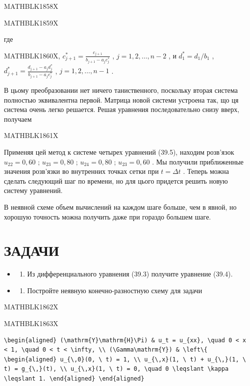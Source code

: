 \documentclass[
  ukrainian,
]{article}
\providecommand{\tightlist}{%
  \setlength{\itemsep}{0pt}\setlength{\parskip}{0pt}}
\begin{document}
MATHBLK1858X

MATHBLK1859X

где

MATHBLK1860X, \(c_{j+1}^* = \frac{c_{j+1}}{b_{j+1} - a_j c_j^*}\) ,
\(j = 1, 2, \ldots, n-2\) , и \(d_1^* = d_1/b_1\) ,
\(d_{j+1}^* = \frac{d_{j+1} - a_j d_j^*}{b_{j+1} - a_j c_j^*}\) ,
\(j = 1, 2, \ldots, n-1\) .

В цьому преобразовании нет ничего таниственного, поскольку вторая
система полностью эквивалентна первой. Матрица новой системи устроена
так, що ця система очень легко решается. Решая уравнения последовательно
снизу вверх, получаем

MATHBLK1861X

Применяя цей метод к системе четырех уравнений (39.5), находим розв'язок
\(u_{22}=0,60\) ; \(u_{23}=0,80\) ; \(u_{24}=0,80\) ; \(u_{23}=0,60\) .
Мы получили приближенные значения розв'язки во внутренних точках сетки
при \(t=\Delta t\) . Теперь можна сделать следующий шаг по времени, но
для цього придется решить новую систему уравнений.

В неявной схеме объем вычислений на каждом шаге больше, чем в явной, но
хорошую точность можна получить даже при гораздо большем шаге.

\section{ЗАДАЧИ}\label{ux437ux430ux434ux430ux447ux438-12}

\begin{itemize}
\tightlist
\item
  \begin{enumerate}
  \def\labelenumi{\arabic{enumi}.}
  \tightlist
  \item
    Из дифференциального уравнения (39.3) получите уравнение (39.4).
  \end{enumerate}
\item
  \begin{enumerate}
  \def\labelenumi{\arabic{enumi}.}
  \setcounter{enumi}{1}
  \tightlist
  \item
    Постройте неявную конечно-разностную схему для задачи
  \end{enumerate}
\end{itemize}

MATHBLK1862X

MATHBLK1863X

\begin{verbatim}
\begin{aligned} (\mathrm{Y}\mathrm{H}\Pi) & u_t = u_{xx}, \quad 0 < x < 1, \quad 0 < t < \infty, \\ (\Gamma\mathrm{Y}) & \left\{ \begin{aligned} u_{\,0}(0, \ t) = 1, \\ u_{\,x}(1, \ t) + u_{\,}(1, \ t) = g_{\,}(t), \\ u_{\,x}(1, \ t) = 0, \quad 0 \leqslant \kappa \leqslant 1. \end{aligned} \end{aligned}
\end{verbatim}
\end{document}

